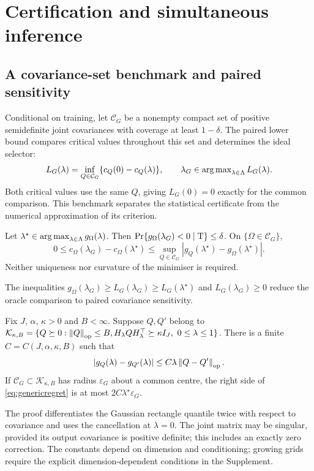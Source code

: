 \section{Certification and simultaneous inference}
\subsection{A covariance-set benchmark and paired sensitivity}
Conditional on training, let $\mathcal C_G$ be a nonempty compact set of positive semidefinite joint covariances with coverage at least $1-\delta$.
The paired lower bound compares critical values throughout this set and determines the ideal selector:
\begin{equation}\label{eq:ideal}
 L_G(\lambda)=\inf_{Q\in\mathcal C_G}\{c_Q(0)-c_Q(\lambda)\},\qquad
 \lambda_G\in\operatorname{arg\,max}_{\lambda\in\Lambda}L_G(\lambda).
\end{equation}
Both critical values use the same $Q$, giving $L_G(0)=0$ exactly for the common comparison.
This benchmark separates the statistical certificate from the numerical approximation of its criterion.

\begin{theorem}\label{th:ideal}
Let $\lambda^\star\in\operatorname{arg\,max}_{\lambda\in\Lambda}g_\Omega(\lambda)$. Then
$\Pr\{g_\Omega(\lambda_G)<0\mid\mathrm{T}\}\leq\delta$. On $\{\Omega\in\mathcal C_G\}$,
\begin{equation}\label{eq:genericregret}
 0\leq c_\Omega(\lambda_G)-c_\Omega(\lambda^\star)
 \leq\sup_{Q\in\mathcal C_G}|g_Q(\lambda^\star)-g_\Omega(\lambda^\star)|.
\end{equation}
Neither uniqueness nor curvature of the minimiser is required.
\end{theorem}
The inequalities $g_\Omega(\lambda_G)\geq L_G(\lambda_G)\geq L_G(\lambda^\star)$ and $L_G(\lambda_G)\geq0$ reduce the oracle comparison to paired covariance sensitivity.

\begin{theorem}\label{th:sensitivity}
Fix $J$, $\alpha$, $\kappa>0$ and $B<\infty$. Suppose $Q,Q'$ belong to
$\mathcal K_{\kappa,B}=\{Q\succeq0:\norm Q_\op\leq B,
H_\lambda QH_\lambda^\top\succeq\kappa I_J,\ 0\leq\lambda\leq1\}$.
There is a finite $C=C(J,\alpha,\kappa,B)$ such that
\begin{equation}\label{eq:pairedlip}
 |g_Q(\lambda)-g_{Q'}(\lambda)|\leq C\lambda\left\lVert Q-Q'\right\rVert_{\mathrm{op}}.
\end{equation}
If $\mathcal C_G\subset\mathcal K_{\kappa,B}$ has radius $\varepsilon_G$ about a common centre, the right side of \eqref{eq:genericregret} is at most $2C\lambda^\star\varepsilon_G$.
\end{theorem}
The proof differentiates the Gaussian rectangle quantile twice with respect to covariance and uses the cancellation at $\lambda=0$.
The joint matrix may be singular, provided its output covariance is positive definite; this includes an exactly zero correction.
The constants depend on dimension and conditioning; growing grids require the explicit dimension-dependent conditions in the Supplement.


